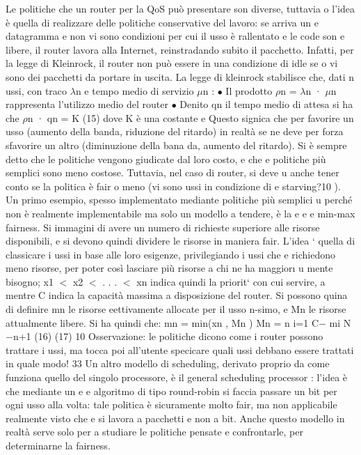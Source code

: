 Le politiche che un router per la QoS può presentare son diverse, tuttavia
o
l'idea è quella di realizzare delle politiche conservative del lavoro: se arriva un
e
datagramma e non vi sono condizioni per cui il usso è rallentato e le code son
e
libere, il router lavora alla Internet, reinstradando subito il pacchetto. Infatti,
per la legge di Kleinrock, il router non può essere in una condizione di idle se
o
vi sono dei pacchetti da portare in uscita. La legge di kleinrock stabilisce che,
dati n ussi, con traco $\lambda$n e tempo medio di servizio $\mu$n :
$\bullet$ Il prodotto $\rho$n = $\lambda$n · $\mu$n rappresenta l'utilizzo medio del router
$\bullet$ Denito qn il tempo medio di attesa si ha che
$\rho$n · qn = K
(15)
dove K è una costante
e
Questo signica che per favorire un usso (aumento della banda, riduzione del
ritardo) in realtà se ne deve per forza sfavorire un altro (diminuzione della bana
da, aumento del ritardo).
Si è sempre detto che le politiche vengono giudicate dal loro costo, e che
e
politiche più semplici sono meno costose. Tuttavia, nel caso di router, si deve
u
anche tener conto se la politica è fair o meno (vi sono ussi in condizione di
e
starving?10 ).
Un primo esempio, spesso implementato mediante politiche più semplici
u
perché non è realmente implementabile ma solo un modello a tendere, è la
e
e
e
min-max fairness. Si immagini di avere un numero di richieste superiore alle
risorse disponibili, e si devono quindi dividere le risorse in maniera fair. L'idea
` quella di classicare i ussi in base alle loro esigenze, privilegiando i ussi che
e
richiedono meno risorse, per poter così lasciare più risorse a chi ne ha maggior\i{}
u
mente bisogno; x1 $<$ x2 $<$ . . . $<$ xn indica quindi la priorit` con cui servire,
a
mentre C indica la capacità massima a disposizione del router. Si possono quina
di definire mn le risorse eettivamente allocate per il usso n-simo, e Mn le
risorse attualmente libere. Si ha quindi che:
mn = min(xn , Mn )
Mn =
n
i=1
C$-$
mi
N $-$n+1
(16)
(17)
10 Osservazione: le politiche dicono come i router possono trattare i ussi, ma tocca poi
all'utente specicare quali ussi debbano essere trattati in quale modo!
33
Un altro modello di scheduling, derivato proprio da come funziona quello del
singolo processore, è il general scheduling processor : l'idea è che mediante un
e
e
algoritmo di tipo round-robin si faccia passare un bit per ogni usso alla volta:
tale politica è sicuramente molto fair, ma non applicabile realmente visto che
e
si lavora a pacchetti e non a bit. Anche questo modello in realtà serve solo per
a
studiare le politiche pensate e confrontarle, per determinarne la fairness.
